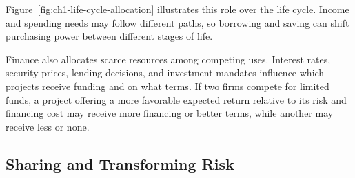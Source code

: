 Figure~\ref{fig:ch1-life-cycle-allocation} illustrates this role over the life cycle. Income and spending needs may follow different paths, so borrowing and saving can shift purchasing power between different stages of life.

Finance also allocates scarce resources among competing uses. Interest rates, security prices, lending decisions, and investment mandates influence which projects receive funding and on what terms. If two firms compete for limited funds, a project offering a more favorable expected return relative to its risk and financing cost may receive more financing or better terms, while another may receive less or none.

\subsection{Sharing and Transforming Risk}

